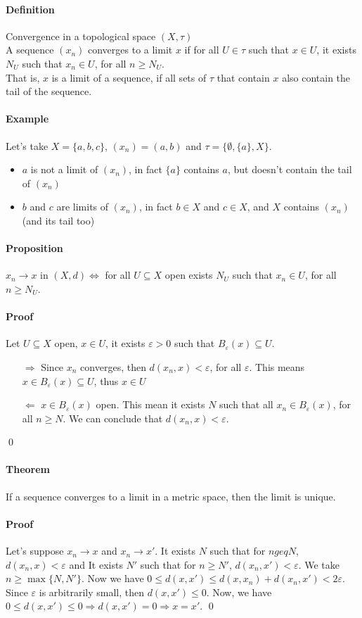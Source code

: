 \documentclass{article}
\newcommand{\Ep}{\varepsilon}
\newcommand{\Def}{\paragraph{Definition}}
\newcommand{\Proposition}{\paragraph{Proposition}}
\newcommand{\Theorem}{\paragraph{Theorem}}
\newcommand{\Proof}{\paragraph{Proof}}
\newcommand{\Example}{\paragraph{Example}}
\begin{document}
  \Def Convergence in a topological space $(X, \tau)$
\\A sequence $(x_n)$ converges to a limit $x$ if for all $U \in \tau$ such that
  $x \in U$, it exists $N_U$ such that $x_n \in U$, for all $n \geq N_U$.
\\That is, $x$ is a limit of a sequence, if all sets of $\tau$ that contain $x$
  also contain the tail of the sequence.

  \Example Let's take $X = \{ a, b, c \}$, $(x_n) = (a, b)$ and $\tau =
  \{ \emptyset, \{ a \}, X \}$.
  \begin{itemize}
    \item $a$ is not a limit of $(x_n)$, in fact $\{ a \}$ contains $a$, but
    doesn't contain the tail of $(x_n)$
    \item $b$ and $c$ are limits of $(x_n)$, in fact $b \in X$ and $c \in X$,
    and $X$ contains $(x_n)$ (and its tail too)
  \end{itemize}

  \Proposition $x_n \to x$ in $(X, d) \iff$ for all $U \subseteq X$ open exists
  $N_U$ such that $x_n \in U$, for all $n \geq N_U$.

  \Proof Let $U \subseteq X$ open, $x \in U$, it exists $\Ep > 0$ such that
  $B_\Ep(x) \subseteq U$.
  \begin{itemize}
    \item[$\Rightarrow$] Since $x_n$ converges, then $d(x_n,x) < \Ep$, for
    all $\Ep$. This means $x \in B_\Ep(x) \subseteq U$, thus $x \in U$
    \item[$\Leftarrow$] $x \in B_\Ep(x)$ open. This mean it exists $N$ such
    that all $x_n \in B_\Ep(x)$, for all $n \geq N$. We can conclude that
    $d(x_n,x) < \Ep$.
  \end{itemize}
  \qed

  \Theorem If a sequence converges to a limit in a metric space, then the limit
  is unique.

  \Proof Let's suppose $x_n \to x$ and $x_n \to x'$.
  It exists $N$ such that for $n geq N$, $d(x_n,x) < \Ep$ and It exists
  $N'$ such that for $n \geq N'$, $d(x_n,x') < \Ep$. We take $n \geq
  \max\{ N, N' \}$. Now we have $0 \leq d(x,x') \leq d(x,x_n) + d(x_n,x') <
  2\Ep$.
\\Since $\Ep$ is arbitrarily small, then $d(x,x') \leq 0$. Now, we have
  $0 \leq d(x,x') \leq 0 \Rightarrow d(x,x') = 0 \Rightarrow x = x'$.
  \qed
\end{document}
